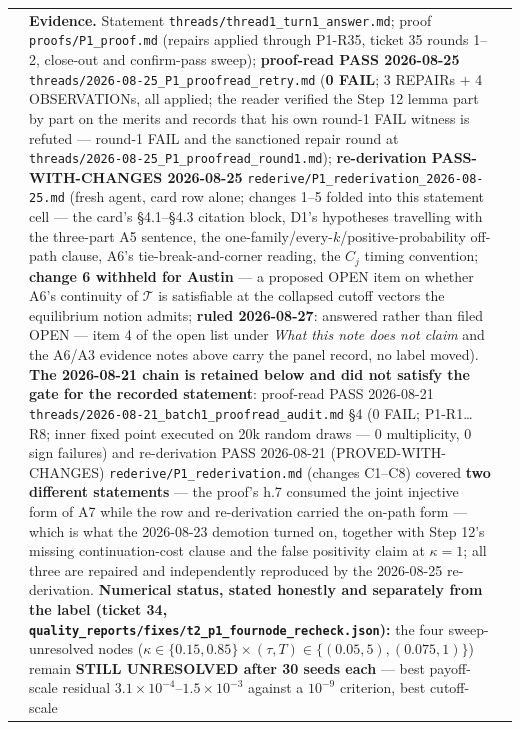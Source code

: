 \documentclass[11pt,a4paper]{article}
\newcommand{\Tmap}{\mathcal{T}}
\begin{document}
\begin{longtable}{@{}p{}>{\raggedright\arraybackslash}p{}>{\raggedright\arraybackslash}p{}@{}}
&
\textbf{Evidence.} Statement \texttt{threads/thread1\_turn1\_answer.md}; proof
\texttt{proofs/P1\_proof.md} (repairs applied through P1-R35, ticket 35 rounds 1--2,
close-out and confirm-pass sweep); \textbf{proof-read PASS 2026-08-25}
\texttt{threads/2026-08-25\_P1\_proofread\_retry.md} (\textbf{0 FAIL}; 3 REPAIRs $+$ 4
OBSERVATIONs, all applied; the reader verified the Step 12 lemma part by part on the
merits and records that his own round-1 FAIL witness is refuted --- round-1 FAIL and the
sanctioned repair round at \texttt{threads/2026-08-25\_P1\_proofread\_round1.md});
\textbf{re-derivation PASS-WITH-CHANGES 2026-08-25}
\texttt{rederive/P1\_rederivation\_2026-08-25.md} (fresh agent, card row alone; changes
1--5 folded into this statement cell --- the card's \S4.1--\S4.3 citation block, D1's
hypotheses travelling with the three-part A5 sentence, the
one-family/every-$k$/positive-probability off-path clause, A6's tie-break-and-corner
reading, the $C_j$ timing convention; \textbf{change 6 withheld for Austin} --- a
proposed OPEN item on whether A6's continuity of $\Tmap$ is satisfiable at the collapsed
cutoff vectors the equilibrium notion admits; \textbf{ruled 2026-08-27}: answered rather
than filed OPEN --- item 4 of the open list under \emph{What this note does not claim}
and the A6/A3 evidence notes above carry the panel record, no label moved).
\textbf{The 2026-08-21 chain is retained below and did not satisfy the gate for the
recorded statement}: proof-read PASS 2026-08-21
\texttt{threads/2026-08-21\_batch1\_proofread\_audit.md} \S4 (0 FAIL; P1-R1\dots R8;
inner fixed point executed on 20k random draws --- 0 multiplicity, 0 sign failures) and
re-derivation PASS 2026-08-21 (PROVED-WITH-CHANGES)
\texttt{rederive/P1\_rederivation.md} (changes C1--C8) covered \textbf{two different
statements} --- the proof's h.7 consumed the joint injective form of A7 while the row and
re-derivation carried the on-path form --- which is what the 2026-08-23 demotion turned
on, together with Step 12's missing continuation-cost clause and the false positivity
claim at $\kappa=1$; all three are repaired and independently reproduced by the
2026-08-25 re-derivation. \textbf{Numerical status, stated honestly and separately from
the label (ticket 34, \texttt{quality\_reports/fixes/t2\_p1\_fournode\_recheck.json}):}
the four sweep-unresolved nodes
($\kappa\in\{0.15,0.85\}\times(\tau,T)\in\{(0.05,5),(0.075,1)\}$) remain \textbf{STILL
UNRESOLVED after 30 seeds each} --- best payoff-scale residual
$3.1\times10^{-4}$--$1.5\times10^{-3}$ against a $10^{-9}$ criterion, best cutoff-scale

\end{longtable}
\end{document}
